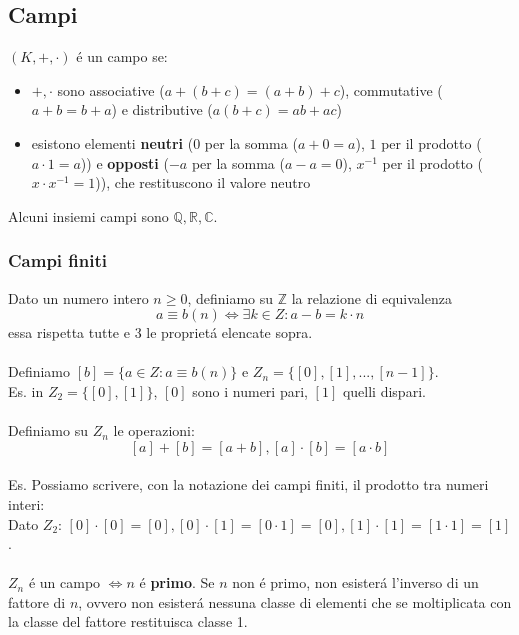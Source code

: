 \documentclass{article}
\begin{document}
\subsection{Campi}
$(K, +, \cdot)$ é un campo se:
\begin{itemize}
	\item[] $+, \cdot$ sono associative ($a+(b+c) = (a+b)+c$), commutative ($a+b=b+a$) e distributive ($a(b+c)=ab+ac$)
	\item[] esistono elementi \textbf{neutri} ($0$ per la somma ($a+0=a$), $1$ per il prodotto ($a \cdot 1 = a$)) e \textbf{opposti} ($-a$ per la somma ($a-a=0$), $x^{-1}$ per il prodotto ($x \cdot x^{-1} = 1$)), che restituscono il valore neutro
\end{itemize}
Alcuni insiemi campi sono $\mathbb{Q}, \mathbb{R}, \mathbb{C}$.

\subsubsection{Campi finiti}
Dato un numero intero $n \ge 0$, definiamo su $\mathbb{Z}$ la relazione di equivalenza
$$a \equiv b (n) \iff \exists k \in Z : a - b = k \cdot n$$
essa rispetta tutte e 3 le proprietá elencate sopra. \\\\
Definiamo $[b] = \{a \in Z : a \equiv b (n)\}$ e $Z_n = \{[0], [1], ..., [n-1]\}$. \\
Es. in $Z_2 = \{[0], [1]\}$, $[0]$ sono i numeri pari, $[1]$ quelli dispari. \\\\
Definiamo su $Z_n$ le operazioni:\\
$$[a] + [b] = [a+b], [a] \cdot [b] = [a \cdot b]$$ \\
Es. Possiamo scrivere, con la notazione dei campi finiti, il prodotto tra numeri interi: \\
Dato $Z_2$: $[0] \cdot [0] = [0], [0] \cdot [1] = [0 \cdot 1] = [0], [1] \cdot [1] = [1 \cdot 1] = [1]$. \\\\
$Z_n$ é un campo $\iff n$ é \textbf{primo}. Se $n$ non é primo, non esisterá l'inverso di un fattore di $n$, ovvero non esisterá nessuna classe di elementi che se moltiplicata con la classe del fattore restituisca classe 1.
\end{document}
